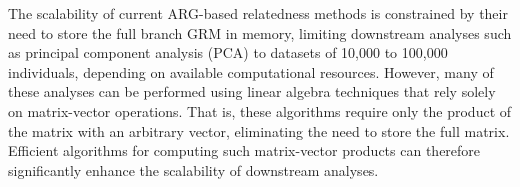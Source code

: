 The scalability of current ARG-based relatedness methods is constrained by their need to store the full branch GRM in memory, limiting downstream analyses such as principal component analysis (PCA) to datasets of 10,000 to 100,000 individuals, depending on available computational resources. However, many of these analyses can be performed using linear algebra techniques that rely solely on matrix-vector operations. That is, these algorithms require only the product of the matrix with an arbitrary vector, eliminating the need to store the full matrix. Efficient algorithms for computing such matrix-vector products can therefore significantly enhance the scalability of downstream analyses. 
%
%
%
%


